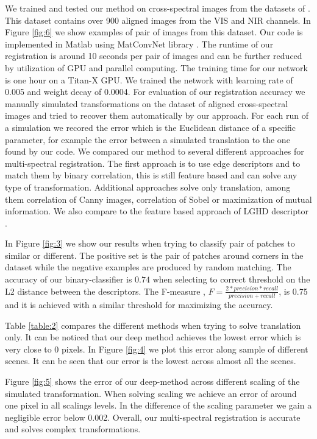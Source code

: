 \documentclass[10pt,twocolumn,letterpaper]{article}
\begin{document}
We trained and tested our method on cross-spectral images from the datasets of \cite{multiSpectralSIFT}. This dataset contains over 900 aligned images from the VIS and NIR channels. In Figure \ref{fig:6} we show examples of pair of images from this dataset. Our code is implemented in Matlab using MatConvNet library \cite{Vedaldi15}. The runtime of our registration is around 10 seconds per pair of images and can be further reduced by utilization of GPU and parallel computing. The training time for our network is one hour on a Titan-X GPU. We trained the network with learning rate of 0.005 and weight decay of 0.0004. For evaluation of our registration accuracy we manually simulated transformations on the dataset of aligned cross-spectral images and tried to recover them automatically by our approach. For each run of a simulation we recored the error which is the Euclidean distance of a specific parameter, for example the error between a simulated translation to the one found by our code. We compared our method to several different approaches for multi-spectral registration. The first approach is to use edge descriptors and to match them by binary correlation, this is still feature based and can solve any type of transformation. Additional approaches solve only translation, among them correlation of Canny \cite{Canny} images, correlation of Sobel \cite{sobel} or maximization of mutual information. We also compare to the feature based approach of LGHD descriptor \cite{lghd2015}.

In Figure \ref{fig:3} we show our results when trying to classify pair of patches to similar or different. The positive set is the pair of patches around corners in the dataset while the negative examples are produced by random matching. The accuracy of our binary-classifier is $0.74$ when selecting to correct threshold on the L2 distance between the descriptors. The F-measure \cite{powers2011evaluation}, $F = \frac{2*precision*recall}{precision+recall}$, is 0.75 and it is achieved with a similar threshold for maximizing the accuracy.

Table \ref{table:2} compares the different methods when trying to solve translation only. It can be noticed that our deep method achieves the lowest error which is very close to 0 pixels. In Figure \ref{fig:4} we plot this error along sample of different scenes. It can be seen that our error is the lowest across almost all the scenes.

Figure \ref{fig:5} shows the error of our deep-method across different scaling of the simulated transformation. When solving scaling we achieve an error of around one pixel in all scalings levels. In the difference of the scaling parameter we gain a negligible error below 0.002. Overall, our multi-spectral registration is accurate and solves complex transformations. 
\end{document}
